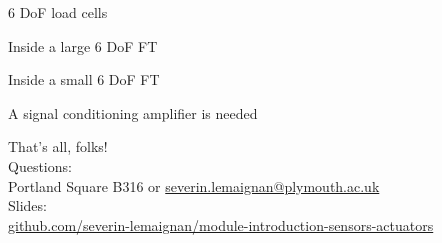 \documentclass[compress]{beamer}
\begin{document}
{
\begin{frame}{6 DoF load cells}

\pnote{
}
\end{frame}
}

{
\begin{frame}{Inside a large 6 DoF FT}

\pnote{
}
\end{frame}
}

{
\begin{frame}{Inside a small 6 DoF FT}

\pnote{
}
\end{frame}
}

{
\begin{frame}{A signal conditioning amplifier is needed}

\pnote{
}
\end{frame}
}

\begin{frame}{}
    \begin{center}
        \Large
        That's all, folks!\\[2em]
        \normalsize
        Questions:\\
        Portland Square B316 or \url{severin.lemaignan@plymouth.ac.uk} \\[1em]

        Slides:\\
        \href{https://github.com/severin-lemaignan/module-introduction-sensors-actuators}{\small
        github.com/severin-lemaignan/module-introduction-sensors-actuators}


    \end{center}
\end{frame}
\end{document}
